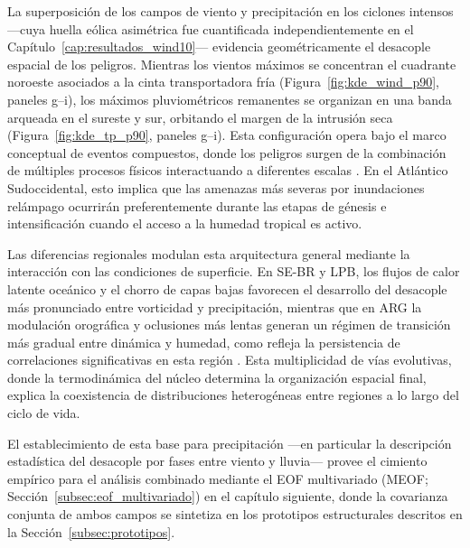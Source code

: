La superposición de los campos de viento y precipitación en los ciclones intensos —cuya huella eólica asimétrica fue cuantificada independientemente en el Capítulo~\ref{cap:resultados_wind10}— evidencia geométricamente el desacople espacial de los peligros. 
Mientras los vientos máximos se concentran el cuadrante noroeste asociados a la cinta transportadora fría (Figura~\ref{fig:kde_wind_p90}, paneles g--i), los máximos pluviométricos remanentes se organizan en una banda arqueada en el sureste y sur, orbitando el margen de la intrusión seca (Figura~\ref{fig:kde_tp_p90}, paneles g--i).
Esta configuración opera bajo el marco conceptual de eventos compuestos, donde los peligros surgen de la combinación de múltiples procesos físicos interactuando a diferentes escalas \citep{zscheischler2018future}. 
En el Atlántico Sudoccidental, esto implica que las amenazas más severas por inundaciones relámpago ocurrirán preferentemente durante las etapas de génesis e intensificación cuando el acceso a la humedad tropical es activo.

Las diferencias regionales modulan esta arquitectura general mediante la interacción con las condiciones de superficie. 
En SE-BR y LPB, los flujos de calor latente oceánico y el chorro de capas bajas favorecen el desarrollo del desacople más pronunciado entre vorticidad y precipitación, mientras que en ARG la modulación orográfica y oclusiones más lentas generan un régimen de transición más gradual entre dinámica y humedad, como refleja la persistencia de correlaciones significativas en esta región \citep{marrafon2022classificacao}. 
Esta multiplicidad de vías evolutivas, donde la termodinámica del núcleo determina la organización espacial final, explica la coexistencia de distribuciones heterogéneas entre regiones a lo largo del ciclo de vida.

El establecimiento de esta base para precipitación ---en particular la descripción estadística del desacople por fases entre viento y lluvia--- provee el cimiento empírico para el análisis combinado mediante el EOF multivariado (MEOF; Sección~\ref{subsec:eof_multivariado}) en el capítulo siguiente, donde la covarianza conjunta de ambos campos se sintetiza en los 
prototipos estructurales descritos en la Sección~\ref{subsec:prototipos}.